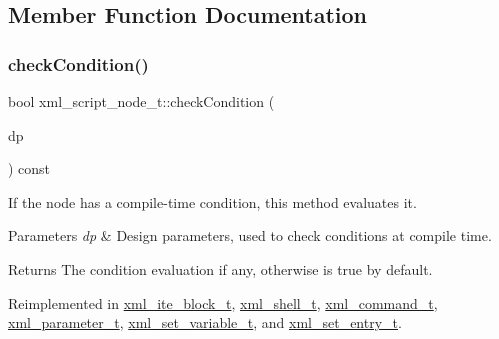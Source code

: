 \subsection{Member Function Documentation}
\mbox{\label{classxml__script__node__t_a13fbe7caa7bed64ab3cc25d51392523d}} 
\subsubsection{\texorpdfstring{check\+Condition()}{checkCondition()}}
{\footnotesize\ttfamily bool xml\+\_\+script\+\_\+node\+\_\+t\+::check\+Condition (\begin{DoxyParamCaption}\item[{const \hyperlink{DesignParameters_8hpp_ae36bb1c4c9150d0eeecfe1f96f42d157}{Design\+Parameters\+Ref} \&}]{dp }\end{DoxyParamCaption}) const\hspace{0.3cm}{\ttfamily [virtual]}}



If the node has a compile-\/time condition, this method evaluates it. 


\begin{DoxyParams}{Parameters}
{\em dp} & Design parameters, used to check conditions at compile time. \\
\hline
\end{DoxyParams}
\begin{DoxyReturn}{Returns}
The condition evaluation if any, otherwise is true by default. 
\end{DoxyReturn}


Reimplemented in \hyperlink{classxml__ite__block__t_a8f68c01acc36d5dba8b1161994d65d17}{xml\+\_\+ite\+\_\+block\+\_\+t}, \hyperlink{classxml__shell__t_aa23d475623b5aafbbbe919a2f23e400c}{xml\+\_\+shell\+\_\+t}, \hyperlink{classxml__command__t_a0bd9c4cf582f671898afd9ec1602a1dd}{xml\+\_\+command\+\_\+t}, \hyperlink{classxml__parameter__t_a3ba5d8470dadb8afd334dfbaba43c05f}{xml\+\_\+parameter\+\_\+t}, \hyperlink{classxml__set__variable__t_a85442505ebbf8662f4791b94a52487d4}{xml\+\_\+set\+\_\+variable\+\_\+t}, and \hyperlink{classxml__set__entry__t_a85ffc00f525e4b5425f60c2908d1bd83}{xml\+\_\+set\+\_\+entry\+\_\+t}.



